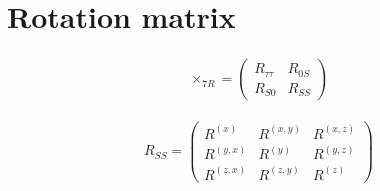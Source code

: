 \documentclass{article}
\begin{document}
\section*{Rotation matrix}

\begin{align}
\times_{7R} =
\begin{pmatrix}
R_{\tau\tau} & R_{0S} \\[1mm]
R_{S0} & R_{SS}
\end{pmatrix}
\end{align}

\begin{align}
R_{SS} =
\begin{pmatrix}
R^{(x)} &R^{(x,y)} & R^{(x,z)} \\
R^{(y,x)} &R^{(y)} & R^{(y,z)} \\
R^{(z,x)} &R^{(z,y)} & R^{(z)}
\end{pmatrix}
\end{align}



\newcommand{\threedaxes}[7][1]{%
    \begin{tikzpicture}[scale=#1]
        \tikzset{axis/.style={-{Stealth[length=#1mm, width=#1mm]}, thick}}
        \draw[axis] (0,0) -- (#3,0) node at (#3-#3/10,-0.2) {\small $#2$};
        \draw[axis] (0,0) -- (0,#5) node at (-0.3,#5-#5/20) {\small $#4$};
        
        \fill[white] (0,0) circle (0.12);
        \draw[thick] (0,0) circle (0.1);
        \ifnum#7<0
            \draw[thick] (0,0) -- (0.07,0.07);
            \draw[thick] (0,0) -- (-0.07,-0.07);
            \draw[thick] (0,0) -- (0.07,-0.07);
            \draw[thick] (0,0) -- (-0.07,0.07);
            \node at (0,-0.25) {\small $#6$};
        \else
        \ifnum#7=0
            \draw[thick] (0,0) -- (0.07,0.07);
            \draw[thick] (0,0) -- (-0.07,-0.07);
            \draw[thick] (0,0) -- (0.07,-0.07);
            \draw[thick] (0,0) -- (-0.07,0.07);
            \fill[black] (0,0) circle (0.05);
            \node at (0,-0.25) {\small $#6$};
        \else
            \fill[black] (0,0) circle (0.05);
            \node at (0,-0.25) {\small $#6$};
        \fi
        \fi
    \end{tikzpicture}%
}
\end{document}
